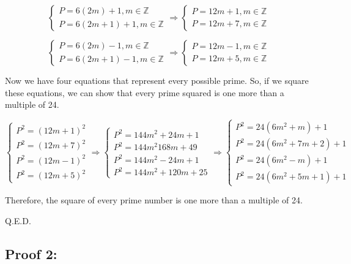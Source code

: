 \[
  \begin{cases}
    P = 6(2m) + 1, m \in \mathbb{Z} \\
    P = 6(2m + 1) + 1, m \in \mathbb{Z}
  \end{cases} \Longrightarrow \begin{cases}
    P = 12m + 1, m \in \mathbb{Z} \\
    P = 12m + 7, m \in \mathbb{Z}
  \end{cases}
\]

\[
  \begin{cases}
    P = 6(2m) - 1, m \in \mathbb{Z} \\
    P = 6(2m + 1) - 1, m \in \mathbb{Z}
  \end{cases} \Longrightarrow \begin{cases}
    P = 12m - 1, m \in \mathbb{Z} \\
    P = 12m + 5, m \in \mathbb{Z}
  \end{cases}
\]

Now we have four equations that represent every possible prime. So, if we square these equations, we can show that every prime squared is one more than a multiple of 24.

\[
    \begin{cases}
        P^2 = (12m + 1)^2 \\
        P^2 = (12m + 7)^2 \\
        P^2 = (12m - 1)^2 \\
        P^2 = (12m + 5)^2
    \end{cases} \Longrightarrow \begin{cases}
        P^2 = 144m^2 + 24m + 1 \\
        P^2 = 144m^2 168m + 49 \\
        P^2 = 144m^2 - 24m + 1 \\
        P^2 = 144m^2 + 120m + 25
    \end{cases} \Longrightarrow \begin{cases}
        P^2 = 24(6m^2 + m) + 1 \\
        P^2 = 24(6m^2 + 7m + 2) + 1 \\
        P^2 = 24(6m^2 - m) + 1 \\
        P^2 = 24(6m^2 + 5m + 1) + 1
    \end{cases}
\]

Therefore, the square of every prime number is one more than a multiple of 24. 

Q.E.D.

\subsection*{Proof 2:}


